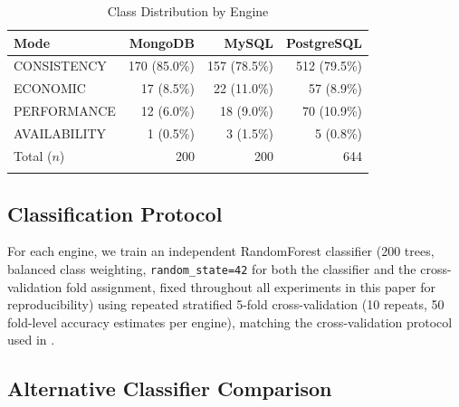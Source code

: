 \documentclass[iicol,pdflatex,sn-mathphys-num]{sn-jnl}
\theoremstyle{thmstyleone}
\theoremstyle{thmstylethree}
\begin{document}
\begin{table}[h]
\caption{Class Distribution by Engine}\label{tab:class-dist}
\footnotesize
\begin{tabular}{@{}lrrr@{}}
\toprule
Mode & MongoDB & MySQL & PostgreSQL \\
\midrule
CONSISTENCY  & 170 (85.0\%) & 157 (78.5\%) & 512 (79.5\%) \\
ECONOMIC     & 17 (8.5\%)   & 22 (11.0\%)  & 57 (8.9\%)   \\
PERFORMANCE  & 12 (6.0\%)   & 18 (9.0\%)   & 70 (10.9\%)  \\
AVAILABILITY & 1 (0.5\%)    & 3 (1.5\%)    & 5 (0.8\%)    \\
\midrule
Total ($n$)  & 200 & 200 & 644 \\
\botrule
\end{tabular}
\end{table}

\subsection{Classification Protocol}\label{subsec:protocol}

For each engine, we train an independent RandomForest classifier
(200 trees, balanced class weighting, \texttt{random\_state=42} for
both the classifier and the cross-validation fold assignment, fixed
throughout all experiments in this paper for reproducibility) using
repeated stratified 5-fold cross-validation (10 repeats, 50 fold-level
accuracy estimates per engine), matching the cross-validation protocol
used in \cite{iaha2026}.

\subsection{Alternative Classifier Comparison}\label{subsec:classifier-comparison-protocol}
\end{document}
